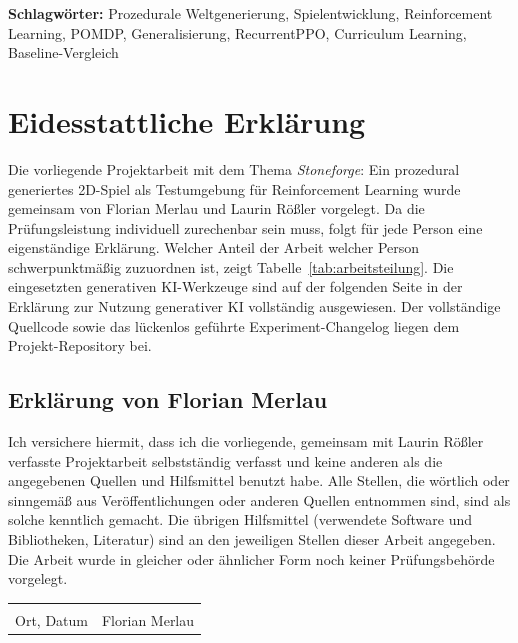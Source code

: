 \documentclass[11pt,a4paper]{article}
\let\sfOldSection\section
\renewcommand{\section}{\clearpage\sfOldSection}
\begin{document}
\vspace{0.5cm}
\noindent\textbf{Schlagwörter:} Prozedurale Weltgenerierung, Spielentwicklung,
Reinforcement Learning, POMDP, Generalisierung, RecurrentPPO,
Curriculum Learning, Baseline-Vergleich

\clearpage

\section*{Eidesstattliche Erklärung}

Die vorliegende Projektarbeit mit dem Thema \glqq \emph{Stoneforge}: Ein
prozedural generiertes 2D-Spiel als Testumgebung für Reinforcement
Learning\grqq{} wurde gemeinsam von Florian Merlau und Laurin Rößler
vorgelegt. Da die Prüfungsleistung individuell zurechenbar sein muss, folgt
für jede Person eine eigenständige Erklärung. Welcher Anteil der Arbeit
welcher Person schwerpunktmäßig zuzuordnen ist, zeigt
Tabelle~\ref{tab:arbeitsteilung}. Die eingesetzten generativen
KI-Werkzeuge sind auf der folgenden Seite in der \glqq Erklärung zur Nutzung
generativer KI\grqq{} vollständig ausgewiesen. Der vollständige Quellcode
sowie das lückenlos geführte Experiment-Changelog liegen dem
Projekt-Repository bei.

\vspace{0.6cm}
\subsection*{Erklärung von Florian Merlau}

Ich versichere hiermit, dass ich die vorliegende, gemeinsam mit Laurin
Rößler verfasste Projektarbeit selbstständig verfasst und keine anderen als
die angegebenen Quellen und Hilfsmittel benutzt habe. Alle Stellen, die
wörtlich oder sinngemäß aus Veröffentlichungen oder anderen Quellen
entnommen sind, sind als solche kenntlich gemacht. Die übrigen Hilfsmittel
(verwendete Software und Bibliotheken, Literatur) sind an den jeweiligen
Stellen dieser Arbeit angegeben. Die Arbeit wurde in gleicher oder
ähnlicher Form noch keiner Prüfungsbehörde vorgelegt.

\vspace{1.8cm}

\noindent
\begin{tabular}{@{}p{6cm}p{6cm}@{}}
\hrulefill & \hrulefill \\[0.2cm]
Ort, Datum & Florian Merlau \\
\end{tabular}
\end{document}
